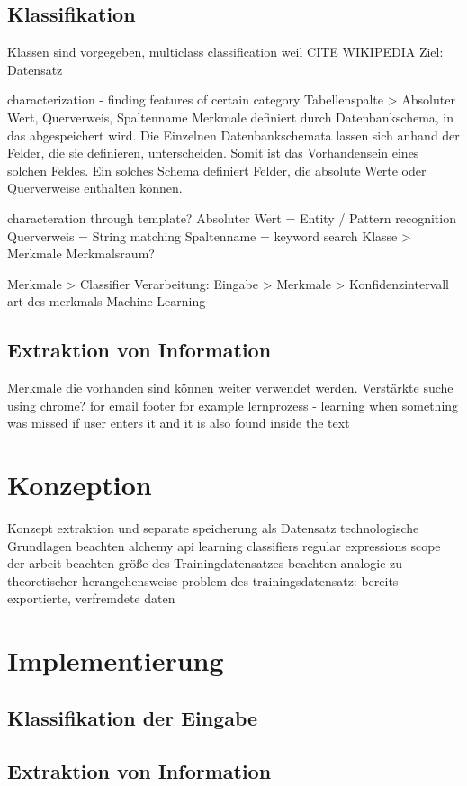 \section{Klassifikation}
Klassen sind vorgegeben, multiclass classification weil CITE WIKIPEDIA
Ziel: Datensatz

characterization - finding features of certain category
Tabellenspalte > Absoluter Wert, Querverweis, Spaltenname
Merkmale definiert durch Datenbankschema, in das abgespeichert wird. Die Einzelnen Datenbankschemata lassen sich anhand der Felder, die sie definieren, unterscheiden. Somit ist das Vorhandensein eines solchen Feldes. Ein solches Schema definiert Felder, die absolute Werte oder Querverweise enthalten können. 

characteration through template?
Absoluter Wert = Entity / Pattern recognition
Querverweis = String matching
Spaltenname = keyword search
Klasse > Merkmale
Merkmalsraum?


Merkmale > Classifier
Verarbeitung: Eingabe > Merkmale > Konfidenzintervall
art des merkmals 
Machine Learning

\section{Extraktion von Information}
Merkmale die vorhanden sind können weiter verwendet werden.
Verstärkte suche
using chrome? for email footer for example
lernprozess - learning when something was missed if user enters it and it is also found inside the text





\chapter{Konzeption}
Konzept extraktion und separate speicherung als Datensatz
technologische Grundlagen beachten
alchemy api
learning classifiers
regular expressions
scope der arbeit beachten
größe des Trainingdatensatzes beachten
analogie zu theoretischer herangehensweise
problem des trainingsdatensatz: bereits exportierte, verfremdete daten
\chapter{Implementierung}
\section{Klassifikation der Eingabe}
\section{Extraktion von Information}

